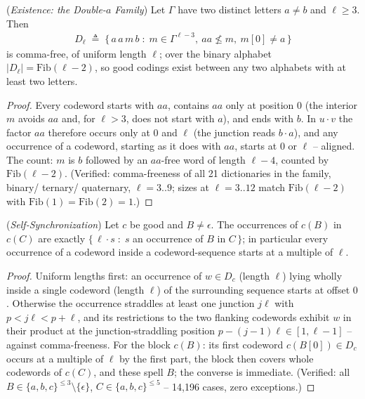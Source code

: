 \begin{lemma}
    (\emph{Existence: the Double-$a$ Family})
    \label{lem:dict}
    Let $\Gamma$ have two distinct letters $a \ne b$ and $\ell \ge 3$. Then
    \begin{align}
        D_\ell \;\triangleq\; \{\, a\,a\,m\,b \;:\; m \in
        \Gamma^{\ell-3},\ aa \not\le m,\ m[0] \ne a \,\}
    \end{align}
    is comma-free, of uniform length $\ell$; over the binary alphabet
    $|D_\ell| = \mathrm{Fib}(\ell-2)$, so good codings exist between any two
    alphabets with at least two letters.
\end{lemma}

\begin{proof}
    Every codeword starts with $aa$, contains $aa$ only at position $0$
    (the interior $m$ avoids $aa$ and, for $\ell > 3$, does not start with
    $a$), and ends with $b$. In $u \cdot v$ the factor $aa$ therefore occurs
    only at $0$ and $\ell$ (the junction reads $b \cdot a$), and any
    occurrence of a codeword, starting as it does with $aa$, starts at $0$
    or $\ell$ -- aligned. The count: $m$ is $b$ followed by an $aa$-free
    word of length $\ell-4$, counted by $\mathrm{Fib}(\ell-2)$.
    (Verified: comma-freeness of all 21 dictionaries in the family, binary/
    ternary/ quaternary, $\ell = 3..9$; sizes at $\ell = 3..12$ match
    $\mathrm{Fib}(\ell-2)$ with $\mathrm{Fib}(1) = \mathrm{Fib}(2) = 1$.)
\end{proof}

\begin{lemma}
    (\emph{Self-Synchronization})
    \label{lem:selfsync}
    Let $c$ be good and $B \ne \epsilon$. The occurrences of $c(B)$ in
    $c(C)$ are exactly $\{\, \ell \cdot s \;:\; s$ an occurrence of $B$ in
    $C \,\}$; in particular every occurrence of a codeword inside a
    codeword-sequence starts at a multiple of $\ell$.
\end{lemma}

\begin{proof}
    Uniform lengths first: an occurrence of $w \in D_c$ (length $\ell$)
    lying wholly inside a single codeword (length $\ell$) of the surrounding
    sequence starts at offset $0$. Otherwise the occurrence straddles at
    least one junction $j\ell$ with $p < j\ell < p + \ell$, and its
    restrictions to the two flanking codewords exhibit $w$ in their product
    at the junction-straddling position $p - (j{-}1)\ell \in [1, \ell-1]$ --
    against comma-freeness. For the block $c(B)$: its first codeword $c(B[0])
    \in D_c$ occurs at a multiple of $\ell$ by the first part, the block
    then covers whole codewords of $c(C)$, and these spell $B$; the converse
    is immediate. (Verified: all $B \in \{a,b,c\}^{\le 3} \setminus
    \{\epsilon\}$, $C \in \{a,b,c\}^{\le 5}$ -- 14,196 cases, zero
    exceptions.)
\end{proof}


